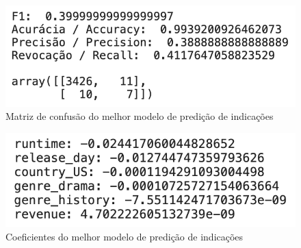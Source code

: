         
        
        \begin{figure}[htb]
        	\caption{\label{confusao_1}Matriz de confusão do melhor modelo de predição de indicações}
        	\begin{center}
        		\includegraphics[scale=0.7]{confusao_1.png}
        	\end{center}
        \end{figure}
        
        \begin{figure}[htb]
        	\caption{\label{coefs_1}Coeficientes do melhor modelo de predição de indicações}
        	\begin{center}
        		\includegraphics[scale=0.7]{coefs_1.png}
        	\end{center}
        \end{figure}
        
